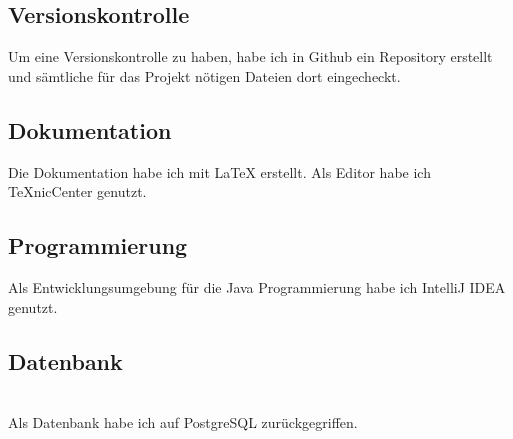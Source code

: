 \subsection{Versionskontrolle}
Um eine Versionskontrolle zu haben, habe ich in Github \cite{Github} ein Repository erstellt und sämtliche für das Projekt nötigen Dateien dort eingecheckt.

\subsection{Dokumentation}
Die Dokumentation habe ich mit \LaTeX{} erstellt. Als Editor habe ich TeXnicCenter \cite{TeXnicCenter} genutzt.

\subsection{Programmierung}
Als Entwicklungsumgebung für die Java Programmierung habe ich IntelliJ IDEA \cite{IntelliJ} genutzt.

\subsection{Datenbank}
\\Als Datenbank habe ich auf PostgreSQL \cite{Postgres} zurückgegriffen.

